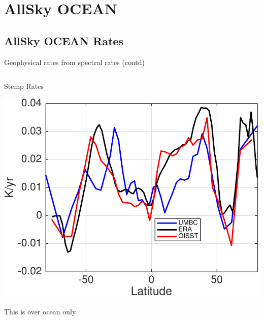 \documentclass[10pt,t]{beamer}
\begin{document}

\section{AllSky OCEAN}
\subsection{AllSky OCEAN Rates}

\begin{frame}{Geophysical rates from spectral rates (contd)}
\vspace{-0.3in}

\begin{columns}
\begin{column}{0.55\columnwidth}
\begin{block}{\footnotesize Stemp Rates}
\vspace{-0.1in}
\begin{center}
\includegraphics[width=\linewidth]{Figs/CloudAnom/Desc_ocean/stemp_lat_rates_from_obs_specral_rates.pdf}
\end{center}
\footnotesize
This is over ocean only
\end{block}
\end{column}


\end{columns}
\end{frame}
\end{document}
